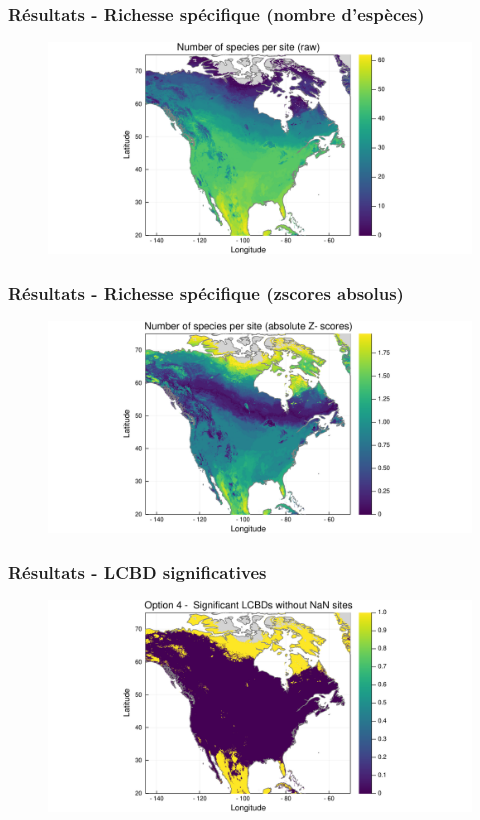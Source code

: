 \documentclass[10pt]{beamer}
\begin{document}
\begin{frame}
  \frametitle{Résultats - Richesse spécifique (nombre d'espèces)}
  \begin{figure}
    \centering
    \includegraphics[scale=0.4]{fig/richness-am-larger2.pdf}
  \end{figure}
\end{frame}

\begin{frame}
  \frametitle{Résultats - Richesse spécifique (zscores absolus)}
  \begin{figure}
    \centering
    \includegraphics[scale=0.4]{fig/richness-am-larger2-zscores.pdf}
  \end{figure}
\end{frame}

\begin{frame}
  \frametitle{Résultats - LCBD significatives}
  \begin{figure}
    \centering
    \includegraphics[scale=0.4]{fig/lcbd-am-larger2-significant.pdf}
  \end{figure}
\end{frame}
\end{document}
